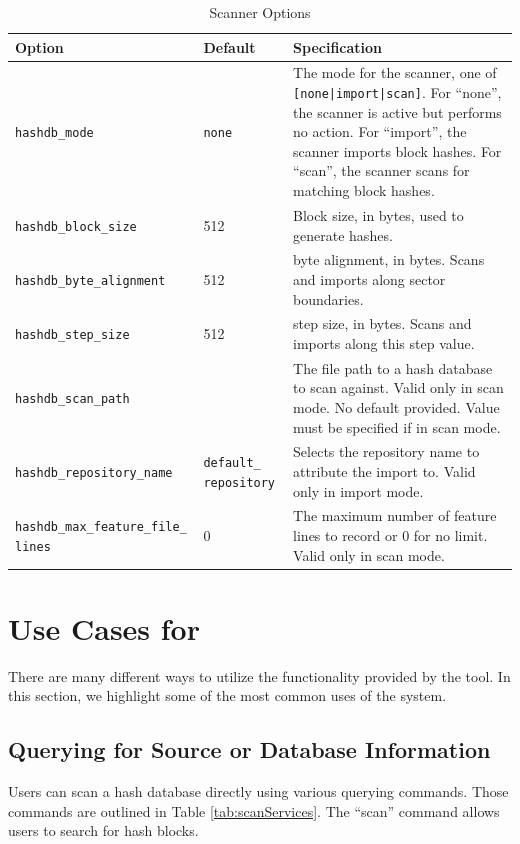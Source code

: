 \documentclass[11pt,fleqn]{article} %
\begin{document}
\begin{table}[!ht]

\centering
\caption{\bulk \hdb Scanner Options}
\label{tab:hashdb_be_usage}
\begin{tabular}{|p{5 cm}|p{2.0 cm}|p{6.5 cm}|}
\hline \hline
\textbf{Option} & \textbf{Default} & \textbf{Specification} \\
\hline
\verb+hashdb_mode+ & \verb+none+ & The mode for the scanner, one of \verb+[none|import|scan]+. For ``none'', the scanner is active but performs no action. For ``import'', the scanner imports block hashes. For ``scan'', the scanner scans for matching block hashes.\\
\hline
\verb+hashdb_block_size+ &512 & Block size, in bytes, used to generate hashes.\\
\hline
\verb+hashdb_byte_alignment+ &512 & byte alignment, in bytes.  Scans and imports along sector boundaries.\\
\hline
\verb+hashdb_step_size+ &512 & step size, in bytes.  Scans and imports along this step value.\\
\hline
\verb+hashdb_scan_path+ & & The file path to a hash database to scan against.  Valid only in scan mode. No default provided. Value must be specified if in scan mode.\\
\hline
\verb+hashdb_repository_name+ & \verb+default_+ \verb+repository+ &Selects the repository name to attribute the import to.  Valid only in import mode.\\
\hline
\verb+hashdb_max_feature_file_+ \verb+lines+ & 0 &The maximum number of feature lines to record or 0 for no limit.  Valid only in scan mode.\\
\hline
\end{tabular}
\end{table}

\section{Use Cases for \hdb}
\label{UseCases}
There are many different ways to utilize the functionality provided by the \hdb tool. In this section, we highlight some of the most common uses of the system.

\subsection{Querying for Source or Database Information}
 Users can scan a hash database directly using various querying commands. Those commands are outlined in Table \ref{tab:scanServices}.  The ``scan'' command allows users to search for hash blocks.\\
\end{document}
